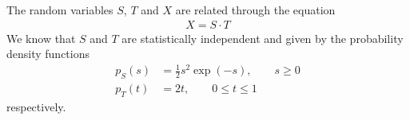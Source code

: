 \question[25] 

\ifspanish

\else

The random variables $S$, $T$ and $X$ are related through the equation
\begin{align*}
X = S \cdot T
\end{align*}
We know that $S$ and $T$ are statistically independent and given by the probability density functions
\begin{align*}
p_{S}(s) &= \frac{1}{2} s^2 \exp(- s),   \qquad s \ge 0  \\
p_{T}(t) &= 2t,					        \qquad 0 \le t \le 1
\end{align*}
respectively.


